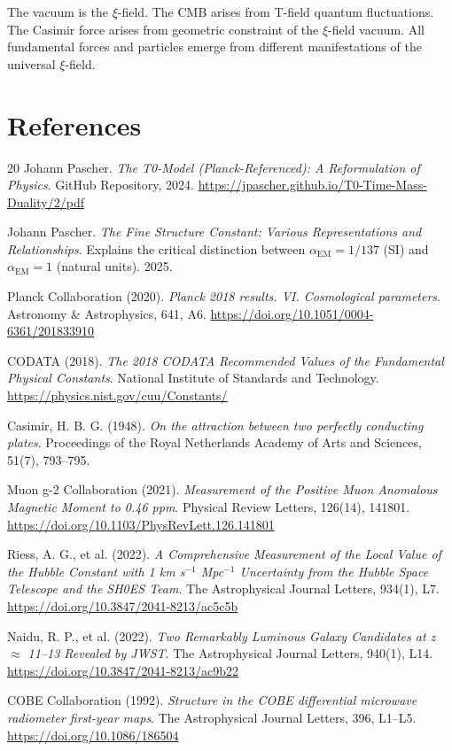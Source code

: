\documentclass[12pt,a4paper]{report}
\begin{document}
	\begin{important}
		The vacuum is the $\xi$-field. The CMB arises from T-field quantum fluctuations. The Casimir force arises from geometric constraint of the $\xi$-field vacuum. All fundamental forces and particles emerge from different manifestations of the universal $\xi$-field.
	\end{important}
	
	\section{References}
	
	\begin{thebibliography}{20}
		Johann Pascher.
		\textit{The T0-Model (Planck-Referenced): A Reformulation of Physics}.
		GitHub Repository, 2024.
		\url{https://jpascher.github.io/T0-Time-Mass-Duality/2/pdf}
		
		Johann Pascher.
		\textit{The Fine Structure Constant: Various Representations and Relationships}.
		Explains the critical distinction between $\alpha_{\text{EM}} = 1/137$ (SI) and $\alpha_{\text{EM}} = 1$ (natural units).
		2025.
		
		Planck Collaboration (2020). 
		\textit{Planck 2018 results. VI. Cosmological parameters}. 
		Astronomy \& Astrophysics, 641, A6. 
		\url{https://doi.org/10.1051/0004-6361/201833910}
		
		CODATA (2018). 
		\textit{The 2018 CODATA Recommended Values of the Fundamental Physical Constants}. 
		National Institute of Standards and Technology. 
		\url{https://physics.nist.gov/cuu/Constants/}
		
		Casimir, H. B. G. (1948). 
		\textit{On the attraction between two perfectly conducting plates}. 
		Proceedings of the Royal Netherlands Academy of Arts and Sciences, 51(7), 793--795.
		
		Muon g-2 Collaboration (2021). 
		\textit{Measurement of the Positive Muon Anomalous Magnetic Moment to 0.46 ppm}. 
		Physical Review Letters, 126(14), 141801. 
		\url{https://doi.org/10.1103/PhysRevLett.126.141801}
		
		Riess, A. G., et al. (2022). 
		\textit{A Comprehensive Measurement of the Local Value of the Hubble Constant with 1 km s$^{-1}$ Mpc$^{-1}$ Uncertainty from the Hubble Space Telescope and the SH0ES Team}. 
		The Astrophysical Journal Letters, 934(1), L7. 
		\url{https://doi.org/10.3847/2041-8213/ac5c5b}
		
		Naidu, R. P., et al. (2022). 
		\textit{Two Remarkably Luminous Galaxy Candidates at z $\approx$ 11--13 Revealed by JWST}. 
		The Astrophysical Journal Letters, 940(1), L14. 
		\url{https://doi.org/10.3847/2041-8213/ac9b22}
		
		COBE Collaboration (1992). 
		\textit{Structure in the COBE differential microwave radiometer first-year maps}. 
		The Astrophysical Journal Letters, 396, L1--L5. 
		\url{https://doi.org/10.1086/186504}
	\end{thebibliography}
\end{document}
